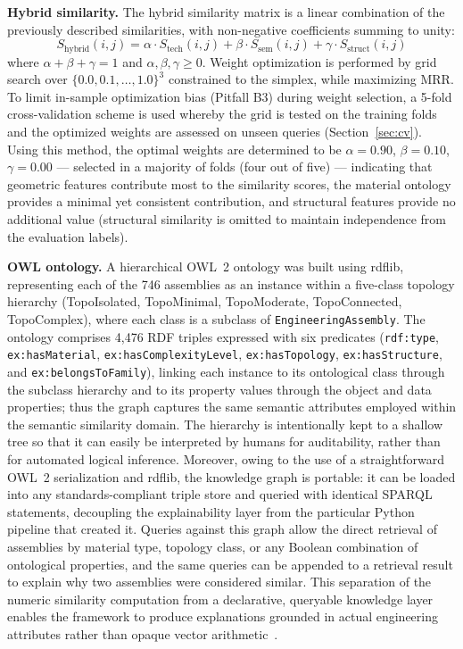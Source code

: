 \documentclass[preprint,12pt]{elsarticle}
\begin{document}
\textbf{Hybrid similarity.} The hybrid similarity matrix is a linear combination of the previously described similarities, with non-negative coefficients summing to unity:
\begin{equation}
S_{\text{hybrid}}(i,j) = \alpha \cdot S_{\text{tech}}(i,j) + \beta \cdot S_{\text{sem}}(i,j) + \gamma \cdot S_{\text{struct}}(i,j)
\label{Eq:HybridSim}
\end{equation}
where $\alpha + \beta + \gamma = 1$ and $\alpha, \beta, \gamma \geq 0$.
Weight optimization is performed by grid search over $\{0.0, 0.1, \ldots, 1.0\}^3$ constrained to the simplex, while maximizing MRR.
To limit in-sample optimization bias (Pitfall B3) during weight selection, a 5-fold cross-validation scheme is used whereby the grid is tested on the training folds and the optimized weights are assessed on unseen queries (Section~\ref{sec:cv}).
Using this method, the optimal weights are determined to be $\alpha{=}0.90$, $\beta{=}0.10$, $\gamma{=}0.00$ --- selected in a majority of folds (four out of five) --- indicating that geometric features contribute most to the similarity scores, the material ontology provides a minimal yet consistent contribution, and structural features provide no additional value (structural similarity is omitted to maintain independence from the evaluation labels).

\textbf{OWL ontology.} A hierarchical OWL~2 ontology was built using rdflib, representing each of the 746 assemblies as an instance within a five-class topology hierarchy (TopoIsolated, TopoMinimal, TopoModerate, TopoConnected, TopoComplex), where each class is a subclass of \texttt{EngineeringAssembly}.
The ontology comprises 4,476 RDF triples expressed with six predicates (\texttt{rdf:type}, \texttt{ex:hasMaterial}, \texttt{ex:hasComplexityLevel}, \texttt{ex:hasTopology}, \texttt{ex:hasStructure}, and \texttt{ex:belongsToFamily}), linking each instance to its ontological class through the subclass hierarchy and to its property values through the object and data properties; thus the graph captures the same semantic attributes employed within the semantic similarity domain.
The hierarchy is intentionally kept to a shallow tree so that it can easily be interpreted by humans for auditability, rather than for automated logical inference.
Moreover, owing to the use of a straightforward OWL~2 serialization and rdflib, the knowledge graph is portable: it can be loaded into any standards-compliant triple store and queried with identical SPARQL statements, decoupling the explainability layer from the particular Python pipeline that created it.
Queries against this graph allow the direct retrieval of assemblies by material type, topology class, or any Boolean combination of ontological properties, and the same queries can be appended to a retrieval result to explain why two assemblies were considered similar.
This separation of the numeric similarity computation from a declarative, queryable knowledge layer enables the framework to produce explanations grounded in actual engineering attributes rather than opaque vector arithmetic~\cite{Rajabi2024}.
\end{document}
